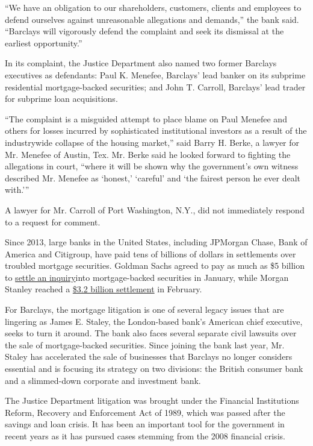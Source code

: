 ``We have an obligation to our shareholders, customers, clients and
employees to defend ourselves against unreasonable allegations and
demands,'' the bank said. ``Barclays will vigorously defend the
complaint and seek its dismissal at the earliest opportunity.''

In its complaint, the Justice Department also named two former Barclays
executives as defendants: Paul K. Menefee, Barclays' lead banker on its
subprime residential mortgage-backed securities; and John T. Carroll,
Barclays' lead trader for subprime loan acquisitions.

``The complaint is a misguided attempt to place blame on Paul Menefee
and others for losses incurred by sophisticated institutional investors
as a result of the industrywide collapse of the housing market,'' said
Barry H. Berke, a lawyer for Mr. Menefee of Austin, Tex. Mr. Berke said
he looked forward to fighting the allegations in court, ``where it will
be shown why the government's own witness described Mr. Menefee as
`honest,' `careful' and `the fairest person he ever dealt with.'''

A lawyer for Mr. Carroll of Port Washington, N.Y., did not immediately
respond to a request for comment.

Since 2013, large banks in the United States, including JPMorgan Chase,
Bank of America and Citigroup, have paid tens of billions of dollars in
settlements over troubled mortgage securities. Goldman Sachs agreed to
pay as much as \$5 billion to
\href{http://www.nytimes.com/2016/01/15/business/dealbook/goldman-to-pay-5-billion-to-settle-claims-of-faulty-mortgages.html}{settle
an inquiry}into mortgage-backed securities in January, while Morgan
Stanley reached a
\href{http://www.nytimes.com/2016/02/12/business/dealbook/morgan-stanley-to-pay-3-2-billion-over-flawed-mortgage-bonds.html}{\$3.2
billion settlement} in February.

For Barclays, the mortgage litigation is one of several legacy issues
that are lingering as James E. Staley, the London-based bank's American
chief executive, seeks to turn it around. The bank also faces several
separate civil lawsuits over the sale of mortgage-backed securities.
Since joining the bank last year, Mr. Staley has accelerated the sale of
businesses that Barclays no longer considers essential and is focusing
its strategy on two divisions: the British consumer bank and a
slimmed-down corporate and investment bank.

The Justice Department litigation was brought under the Financial
Institutions Reform, Recovery and Enforcement Act of 1989, which was
passed after the savings and loan crisis. It has been an important tool
for the government in recent years as it has pursued cases stemming from
the 2008 financial crisis.

